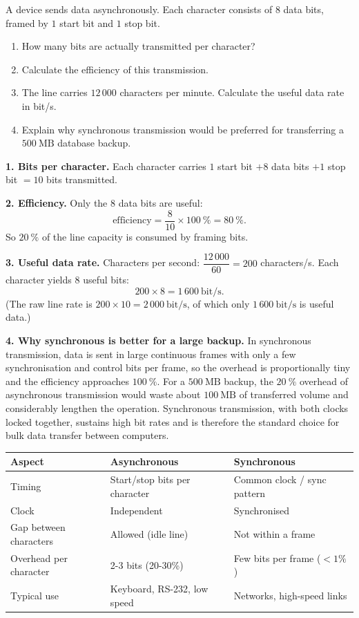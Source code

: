 \documentclass[11pt]{article}
\begin{document}
\begin{exoresolu}
A device sends data asynchronously. Each character consists of $8$ data bits, framed by $1$ start bit and $1$ stop bit.
\begin{enumerate}
\item How many bits are actually transmitted per character?
\item Calculate the efficiency of this transmission.
\item The line carries $12\,000$ characters per minute. Calculate the useful data rate in bit/s.
\item Explain why synchronous transmission would be preferred for transferring a $500\ \mathrm{MB}$ database backup.
\end{enumerate}
\tcblower
\textbf{1. Bits per character.} Each character carries $1$ start bit $+ 8$ data bits $+ 1$ stop bit $= 10$ bits transmitted.

\textbf{2. Efficiency.} Only the $8$ data bits are useful:
\[ \text{efficiency} = \dfrac{8}{10} \times 100\ \% = 80\ \%. \]
So $20\ \%$ of the line capacity is consumed by framing bits.

\textbf{3. Useful data rate.} Characters per second: $\dfrac{12\,000}{60} = 200$ characters/s. Each character yields $8$ useful bits:
\[ 200 \times 8 = 1\,600\ \mathrm{bit/s}. \]
(The raw line rate is $200 \times 10 = 2\,000\ \mathrm{bit/s}$, of which only $1\,600\ \mathrm{bit/s}$ is useful data.)

\textbf{4. Why synchronous is better for a large backup.} In synchronous transmission, data is sent in large continuous frames with only a few synchronisation and control bits per frame, so the overhead is proportionally tiny and the efficiency approaches $100\ \%$. For a $500\ \mathrm{MB}$ backup, the $20\ \%$ overhead of asynchronous transmission would waste about $100\ \mathrm{MB}$ of transferred volume and considerably lengthen the operation. Synchronous transmission, with both clocks locked together, sustains high bit rates and is therefore the standard choice for bulk data transfer between computers.
\end{exoresolu}

\begin{center}
\begin{tabularx}{\linewidth}{|l|X|X|}
\hline
\rowcolor{popblueL} \textbf{Aspect} & \textbf{Asynchronous} & \textbf{Synchronous} \\
\hline
Timing & Start/stop bits per character & Common clock / sync pattern \\
\hline
Clock & Independent & Synchronised \\
\hline
Gap between characters & Allowed (idle line) & Not within a frame \\
\hline
Overhead per character & 2-3 bits (20-30\%) & Few bits per frame ($<1\%$) \\
\hline
Typical use & Keyboard, RS-232, low speed & Networks, high-speed links \\
\hline
\end{tabularx}
\end{center}
\end{document}
